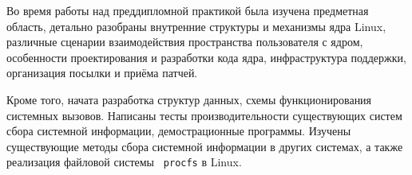 \label{sec:outro}

Во время работы над преддипломной практикой была изучена предметная область,
детально разобраны внутренние структуры и механизмы ядра Linux, различные
сценарии взаимодействия пространства пользователя с ядром, особенности
проектирования и разработки кода ядра, инфраструктура поддержки, организация
посылки и приёма патчей.

Кроме того, начата разработка структур данных, схемы функционирования системных
вызовов. Написаны тесты производительности существующих систем сбора системной
информации, демострационные программы. Изучены существующие методы сбора
системной информации в других системах, а также реализация файловой системы {\tt
procfs} в Linux.